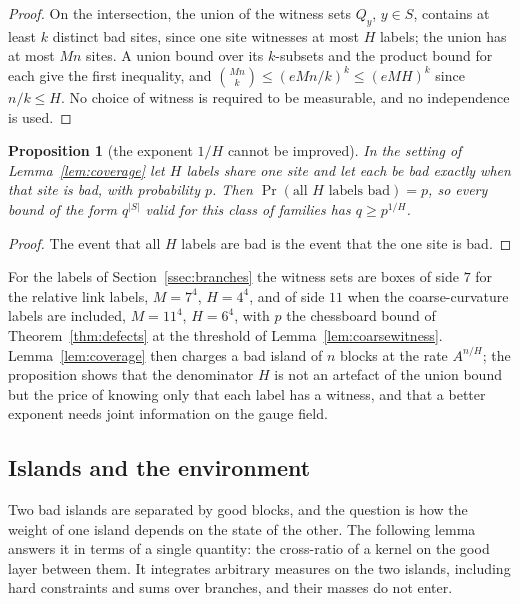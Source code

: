 \documentclass[11pt]{amsart}
\newtheorem{proposition}[theorem]{Proposition}
\theoremstyle{definition}
\theoremstyle{remark}
\numberwithin{equation}{section}
\begin{document}
\begin{proof}
On the intersection, the union of the witness sets $Q_y$, $y\in S$,
contains at least $k$ distinct bad sites, since one site witnesses at most
$H$ labels; the union has at most $Mn$ sites. A union bound over its
$k$-subsets and the product bound for each give the first inequality, and
$\binom{Mn}k\le(eMn/k)^k\le(eMH)^k$ since $n/k\le H$. No choice of witness
is required to be measurable, and no independence is used.
\end{proof}

\begin{proposition}[the exponent $1/H$ cannot be improved]\label{prop:coverageopt}
In the setting of Lemma~\ref{lem:coverage} let $H$ labels share one site
and let each be bad exactly when that site is bad, with probability $p$.
Then $\Pr(\text{all }H\text{ labels bad})=p$, so every bound of the form
$q^{|S|}$ valid for this class of families has $q\ge p^{1/H}$.
\end{proposition}

\begin{proof}
The event that all $H$ labels are bad is the event that the one site is
bad.
\end{proof}

For the labels of Section~\ref{ssec:branches} the witness sets are boxes of
side $7$ for the relative link labels, $M=7^4$, $H=4^4$, and of side $11$
when the coarse-curvature labels are included, $M=11^4$, $H=6^4$, with $p$
the chessboard bound of Theorem~\ref{thm:defects} at the threshold of
Lemma~\ref{lem:coarsewitness}. Lemma~\ref{lem:coverage} then charges a bad
island of $n$ blocks at the rate $A^{n/H}$; the proposition shows that
the denominator $H$ is not an artefact of the union bound but the price of
knowing only that each label has a witness, and that a better exponent
needs joint information on the gauge field.

\subsection{Islands and the environment}\label{ssec:environment}

Two bad islands are separated by good blocks, and the question is how the
weight of one island depends on the state of the other. The following
lemma answers it in terms of a single quantity: the cross-ratio of a
kernel on the good layer between them. It integrates arbitrary measures on
the two islands, including hard constraints and sums over branches, and
their masses do not enter.
\end{document}
